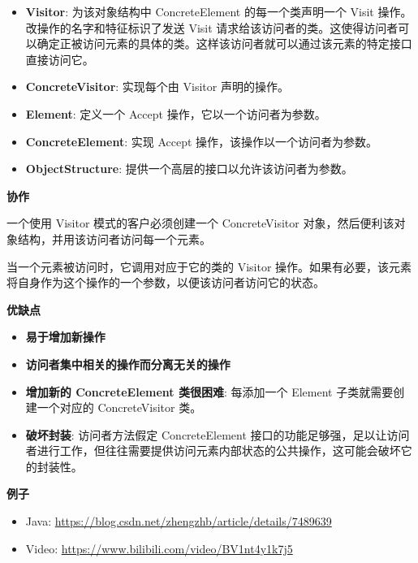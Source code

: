 \begin{itemize}
    \item \textbf{Visitor}: 为该对象结构中 ConcreteElement 的每一个类声明一个 Visit 操作。改操作的名字和特征标识了发送 Visit 请求给该访问者的类。这使得访问者可以确定正被访问元素的具体的类。这样该访问者就可以通过该元素的特定接口直接访问它。
    \item \textbf{ConcreteVisitor}: 实现每个由 Visitor 声明的操作。
    \item \textbf{Element}: 定义一个 Accept 操作，它以一个访问者为参数。
    \item \textbf{ConcreteElement}: 实现 Accept 操作，该操作以一个访问者为参数。
    \item \textbf{ObjectStructure}: 提供一个高层的接口以允许该访问者为参数。
\end{itemize}

\noindent\textbf{协作}

一个使用 Visitor 模式的客户必须创建一个 ConcreteVisitor 对象，然后便利该对象结构，并用该访问者访问每一个元素。

当一个元素被访问时，它调用对应于它的类的 Visitor 操作。如果有必要，该元素将自身作为这个操作的一个参数，以便该访问者访问它的状态。

\noindent\textbf{优缺点}

\begin{itemize}
    \item \textbf{易于增加新操作}
    \item \textbf{访问者集中相关的操作而分离无关的操作}
    \item \textbf{增加新的 ConcreteElement 类很困难}: 每添加一个 Element 子类就需要创建一个对应的 ConcreteVisitor 类。
    \item \textbf{破坏封装}: 访问者方法假定 ConcreteElement 接口的功能足够强，足以让访问者进行工作，但往往需要提供访问元素内部状态的公共操作，这可能会破坏它的封装性。
\end{itemize}

\noindent\textbf{例子}

\begin{itemize}
    \item Java: \url{https://blog.csdn.net/zhengzhb/article/details/7489639}
    \item Video: \url{https://www.bilibili.com/video/BV1nt4y1k7j5}
\end{itemize}



\newpage